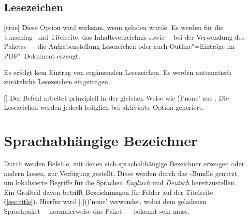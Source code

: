 \begin{Declaration*}{}
\begin{Declaration*}{}
\begin{Declaration*}{}
\subsection{Lesezeichen}
%
%
\begin{Declaration}{}[true]%
\printdeclarationlist%
%
%
%
%
%
%
%
Diese Option wird wirksam, wenn  geladen wurde. Es werden für 
die Umschlag- und Titelseite, das Inhaltsverzeichnis sowie~-- bei der 
Verwendung des Paketes ~-- die Aufgabenstellung 
Lesezeichen oder auch Outline"=Einträge im PDF"~Dokument erzeugt.
%
\begin{values}{}
\itemfalse
  Es erfolgt kein Eintrag von ergänzenden Lesezeichen.
\itemtrue*
  Es werden automatisch zusätzliche Lesezeichen eingetragen.
\end{values}
\end{Declaration}

\begin{Declaration}{%
  []%
}%
\printdeclarationlist%
%
Der Befehl  arbeitet prinzipiell in der gleichen Weise wie 
()'none' aus . Die 
Lesezeichen werden jedoch lediglich bei aktivierte Option  
generiert.
\end{Declaration}



\section{Sprachabhängige Bezeichner}
%
%
%
%
Durch \KOMAScript{} werden Befehle, mit denen sich sprachabhängige Bezeichner 
erzeugen oder ändern lassen, zur Verfügung gestellt. Diese werden durch das
\TUDScript-Bundle genutzt, um lokalisierte Begriffe für die Sprachen 
\emph{Englisch} und \emph{Deutsch} bereitzustellen. Ein Großteil davon betrifft 
Bezeichnungen für Felder auf der Titelseite (\autoref{sec:title}). Hierfür wird
[%
]()'none'
verwendet, wobei  dem geladenen Sprachpaket~-- normalerweise das 
Paket ~-- bekannt sein muss.


\end{Declaration*}
\end{Declaration*}
\end{Declaration*}

